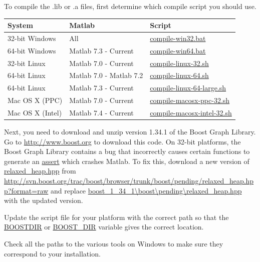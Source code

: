 \documentclass[12pt]{article}
\newcommand{\mycmd}[1]{\url{#1}}
\begin{document}
To compile the .lib or .a files, first determine which compile script you should use.  
\begin{center}
\begin{tabular}{lll}
\hline \hline
\textbf{System} & \textbf{Matlab} & \textbf{Script}\\
\hline
32-bit Windows & All & \mycmd{compile-win32.bat}\\
64-bit Windows & Matlab 7.3 - Current & \mycmd{compile-win64.bat}\\
32-bit Linux & Matlab 7.0 - Current & \mycmd{compile-linux-32.sh}\\
64-bit Linux & Matlab 7.0 - Matlab 7.2 & \mycmd{compile-linux-64.sh}\\
64-bit Linux & Matlab 7.3 - Current & \mycmd{compile-linux-64-large.sh}\\
Mac OS X (PPC) & Matlab 7.0 - Current & \mycmd{compile-macosx-ppc-32.sh}\\
Mac OS X (Intel) & Matlab 7.4 - Current & \mycmd{compile-macosx-intel-32.sh}\\
\hline
\end{tabular}
\end{center}
Next, you need to download and unzip version 1.34.1 of the Boost Graph Library.  Go to \url{http://www.boost.org} to download this code.  On 32-bit platforms, the Boost Graph Library contains a bug that incorrectly causes certain functions to generate an \mycmd{assert} which crashes Matlab.  To fix this, download a new version of \url{relaxed_heap.hpp} from \url{http://svn.boost.org/trac/boost/browser/trunk/boost/pending/relaxed_heap.hpp?format=raw} and replace \url{boost_1_34_1\boost\pending\relaxed_heap.hpp} with the updated version.  

Update the script file for your platform with the correct path so that the \mycmd{BOOSTDIR} or \mycmd{BOOST_DIR} variable gives the correct location.  

Check all the paths to the various tools on Windows to make sure they correspond to your installation.  
\end{document}
